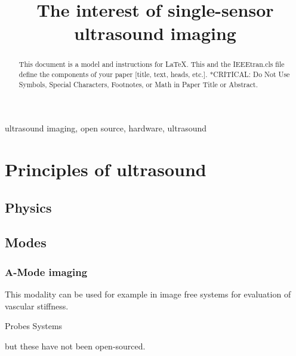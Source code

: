 \documentclass[conference]{IEEEtran}
\begin{document}
\title{The interest of single-sensor ultrasound imaging}

\author{

}

\maketitle

\begin{abstract}
This document is a model and instructions for \LaTeX.
This and the IEEEtran.cls file define the components of your paper [title, text, heads, etc.]. *CRITICAL: Do Not Use Symbols, Special Characters, Footnotes, 
or Math in Paper Title or Abstract.
\end{abstract}

\begin{IEEEkeywords}
ultrasound imaging, open source, hardware, ultrasound
\end{IEEEkeywords}


\section{Principles of ultrasound}


\subsection{Physics}


\subsection{Modes}





\subsubsection{A-Mode imaging}


This modality can be used for example in image free systems for evaluation of vascular stiffness. \cite{joseph_artsenstouch_2015}


Probes \cite{carotenuto_very_2004}
Systems

but these have not been open-sourced.
\end{document}

